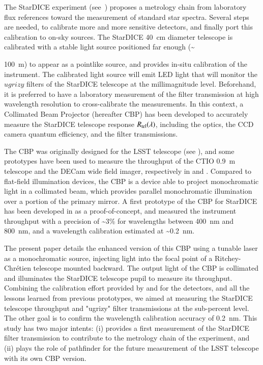 The StarDICE experiment (see~\cite{Betoule_2023}) proposes a metrology chain from laboratory flux references toward the measurement of standard star spectra. Several steps are needed, to calibrate more and more sensitive detectors, and finally port this calibration to on-sky sources. The StarDICE \SI{40}{\centi\meter} diameter telescope is calibrated with a stable light source positioned far enough (\textasciitilde {\SI{100}{\meter}) to appear as a pointlike source, and provides in-situ calibration of the instrument. The calibrated light source will emit LED light that will monitor the $ugrizy$ filters of the StarDICE telescope at the millimagnitude level. Beforehand, it is preferred to have a laboratory measurement of the filter transmission at high wavelength resolution to cross-calibrate the measurements. In this context, a Collimated Beam Projector (hereafter CBP) has been developed to accurately measure the StarDICE telescope response $R_{\mathrm{tel}}(\lambda)$, including the optics, the CCD camera quantum efficiency, and the filter transmissions. 

The CBP was originally designed for the LSST telescope (see \cite{ingraham2016}), and some prototypes have been used to measure the throughput of the CTIO \SI{0.9}{\meter} telescope and the DECam wide field imager, respectively in \cite{coughlin2018} and \cite{coughlin2016}. Compared to flat-field illumination devices, the CBP is a device able to project monochromatic light in a collimated beam, which provides parallel monochromatic illumination over a portion of the primary mirror. A first prototype of the CBP for StarDICE has been developed in \cite{Mondrik_2023} as a proof-of-concept, and measured the instrument throughput with a precision of \textasciitilde 3\% for wavelengths between \SI{400}{\nano\meter} and \SI{800}{\nano\meter}, and a wavelength calibration estimated at \textasciitilde \SI{0.2}{\nano\meter}. 

The present paper details the enhanced version of this CBP using a tunable laser as a monochromatic source, injecting light into the focal point of a Ritchey-Chrétien telescope mounted backward. The output light of the CBP is collimated and illuminates the StarDICE telescope pupil to measure its throughput. Combining the calibration effort provided by \cite{houston2008detectors} and \cite{solarcell} for the detectors, and all the lessons learned from previous prototypes, we aimed at measuring the StarDICE telescope throughput and "ugrizy" filter transmissions at the sub-percent level. The other goal is to confirm the wavelength calibration accuracy of \SI{0.2}{\nano\meter}. This study has two major intents: (i) provides a first measurement of the StarDICE filter transmission to contribute to the metrology chain of the experiment, and (ii) plays the role of pathfinder for the future measurement of the LSST telescope with its own CBP version.

}
